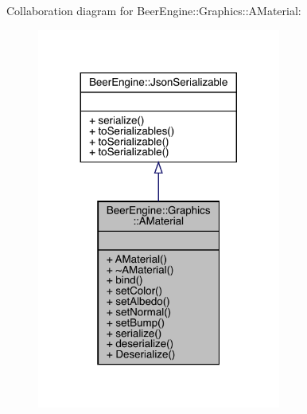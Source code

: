 Collaboration diagram for Beer\+Engine\+:\+:Graphics\+:\+:A\+Material\+:\nopagebreak
\begin{figure}[H]
\begin{center}
\leavevmode
\includegraphics[width=227pt]{class_beer_engine_1_1_graphics_1_1_a_material__coll__graph}
\end{center}
\end{figure}
